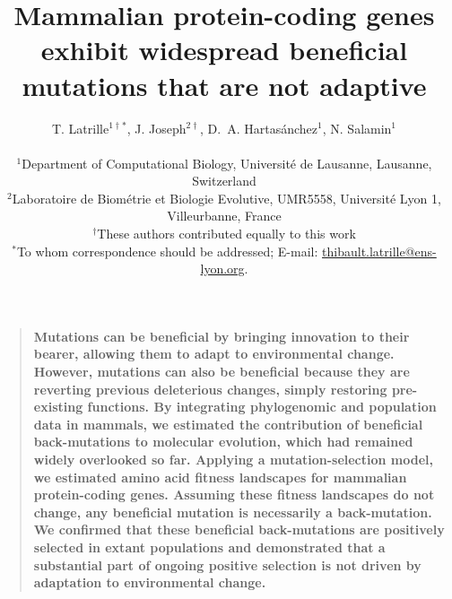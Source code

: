 \documentclass[12pt]{article}
\title{Mammalian protein-coding genes exhibit widespread beneficial mutations that are not adaptive}
\author
{T. {Latrille}$^{1\dag\ast}$, J. {Joseph}$^{2\dag}$, D.~A. {Hartasánchez}$^{1}$, N. {Salamin}$^{1}$\\
\\
\normalsize{$^{1}$Department of Computational Biology, Université de Lausanne, Lausanne, Switzerland}\\
\normalsize{$^{2}$Laboratoire de Biométrie et Biologie Evolutive, UMR5558, Université Lyon 1, Villeurbanne, France}\\
\normalsize{$^{\dag}$These authors contributed equally to this work}\\
\normalsize{$^\ast$To whom correspondence should be addressed; E-mail:  \href{mailto:thibault.latrille@ens-lyon.org}{thibault.latrille@ens-lyon.org}.}
}
\date{}
\newenvironment{sciabstract}{%
\begin{quote} \bf}
{\end{quote}}
\begin{document}
 


\baselineskip24pt


\maketitle 


\begin{sciabstract}
    Mutations can be beneficial by bringing innovation to their bearer, allowing them to adapt to environmental change.
    However, mutations can also be beneficial because they are reverting previous deleterious changes, simply restoring pre-existing functions.
    By integrating phylogenomic and population data in mammals, we estimated the contribution of beneficial back-mutations to molecular evolution, which had remained widely overlooked so far.
    Applying a mutation-selection model, we estimated amino acid fitness landscapes for mammalian protein-coding genes.
    Assuming these fitness landscapes do not change, any beneficial mutation is necessarily a back-mutation.
    We confirmed that these beneficial back-mutations are positively selected in extant populations and demonstrated that a substantial part of ongoing positive selection is not driven by adaptation to environmental change.
\end{sciabstract}
\end{document}
